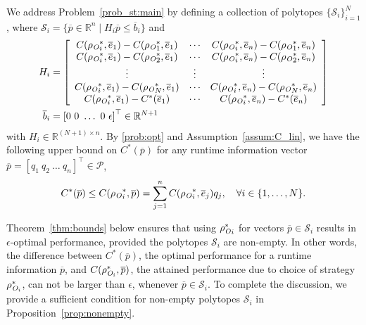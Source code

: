 We address Problem~\ref{prob_st:main} by defining a collection of polytopes $\{\mathcal{S}_i\}_{i=1}^N$, where $\mathcal{S}_i= \{ \overline{p} \in \mathbb{R}^n \mid H_i \overline{p}\leq
\overline{b}_i\}$ and
{\small\begin{align}
    H_i &= \left[
        \begin{array}{ccc}
            C({\rho_{\textit{O}}}_i^\ast, \overline{e}_1) -
            C({\rho_{\textit{O}}}_1^\ast, \overline{e}_1) &
            \cdots &
            C({\rho_{\textit{O}}}_i^\ast, \overline{e}_n) -
            C({\rho_{\textit{O}}}_1^\ast, \overline{e}_n)\\
            C({\rho_{\textit{O}}}_i^\ast, \overline{e}_1) -
            C({\rho_{\textit{O}}}_2^\ast, \overline{e}_1) &
            \cdots &
            C({\rho_{\textit{O}}}_i^\ast, \overline{e}_n) -
            C({\rho_{\textit{O}}}_2^\ast, \overline{e}_n)\\
            \vdots & \vdots & \vdots \\
            C({\rho_{\textit{O}}}_i^\ast, \overline{e}_1) -
            C({\rho_{\textit{O}}}_N^\ast, \overline{e}_1) &
            \cdots &
            C({\rho_{\textit{O}}}_i^\ast, \overline{e}_n) -
            C({\rho_{\textit{O}}}_N^\ast, \overline{e}_n)\\
            C({\rho_{\textit{O}}}_i^\ast, \overline{e}_1) -
            C^\ast(\overline{e}_1) &
            \cdots &
            C({\rho_{\textit{O}}}_i^\ast, \overline{e}_n) -
            C^\ast(\overline{e}_n)
    \end{array}\right] \label{eq:A_defn} \\
        \overline{b}_i&={[0\ 0\ \ldots\ 0\
        \epsilon]}^\top\in \mathbb{R}^{N+1}\label{eq:b_defn}
\end{align}}%
with $H_i\in \mathbb{R}^{(N+1)\times n}$. By \eqref{prob:opt} and Assumption~\ref{assum:C_lin}, we have the following upper bound on $C^\ast(\overline{p})$ for any runtime information vector $ \overline{p}={[q_1\ q_2\ \ldots\ q_n]}^\top\in
\mathcal{P}$,
\begin{align}
    C^\ast( \overline{p})\leq
    C({\rho_{\textit{O}}}_i^\ast,
    \overline{p})=\sum_{j=1}^nC({\rho_{\textit{O}}}_i^\ast,
    \overline{e}_j)q_j\label{eq:C_ub},\quad \forall
    i\in\{1,\ldots,N\}.
\end{align}

Theorem~\ref{thm:bounds} below ensures that using ${\rho_{\textit{O}}^\ast}_i$ for vectors $\overline p \in \mathcal{S}_i$ results in $\epsilon$-optimal performance, provided the polytopes $\mathcal{S}_i$ are non-empty. In other words, the difference between $C^\ast(\overline p)$, the optimal performance for a runtime information $\overline{p}$,  and $C(\rho_{\textit{O}_i}^\ast, \overline p)$, the attained performance due to choice of strategy $\rho_{\textit{O}_i}^\ast$,  can not be larger than $\epsilon$, whenever $\overline p \in \mathcal{S}_i$. To complete the discussion, we provide a sufficient condition for non-empty polytopes $\mathcal{S}_i$ in Proposition~\ref{prop:nonempty}.
 
